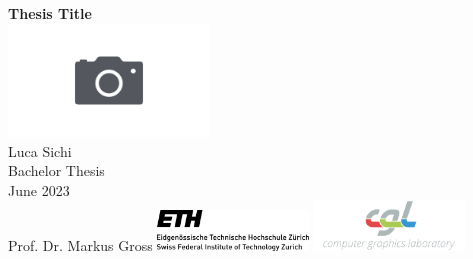 \documentclass[a4paper,twoside,12pt,chapterprefix=false]{scrbook}
\begin{document}
%


\newcommand{\mfytext}[0]{my fancy text}

\newcommand{\chpref}[1]{Chapter \ref{#1}}
\newcommand{\secref}[1]{Section \ref{#1}}
\newcommand{\figref}[1]{Figure \ref{#1}}
\newcommand{\tabref}[1]{Table \ref{#1}}
\newcommand{\apxref}[1]{Appendix \ref{#1}}

\hypersetup{pageanchor=false} %

%
\begin{titlepage}
	\topmargin 1.0cm
	\oddsidemargin 0.0cm
	\evensidemargin 0.0cm
	\centering
	\Huge
	\vspace{3.0cm}
	\textbf{\textsf{Thesis Title}} \\[2.0cm]
	\includegraphics*[width=0.4\textwidth]{figures/placeholderTeaser} \\
	\vspace{5.0cm}
	\sffamily
	\Large
	Luca Sichi
	\\[0.8cm]
	\large
	Bachelor Thesis
	\\
	June 2023
	\\[1.3cm]
	Prof. Dr. Markus Gross
	\vfill
	\includegraphics*[width=0.3\textwidth]{figures/ETH_logo} \hfill
	\includegraphics*[width=0.3\textwidth]{figures/CGL_logo}
	\vspace{3.4cm}
\end{titlepage}
\clearemptydoublepage
\end{document}
